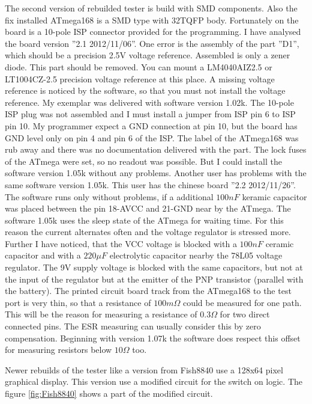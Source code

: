The second version of rebuilded tester is build with SMD components. Also the fix installed ATmega168
is a SMD type with 32TQFP body.
Fortunately on the board is a 10-pole ISP connector provided for the programming.
I have analysed the board version ''2.1 2012/11/06''. One error is the assembly of the part ''D1'',
which should be a precision 2.5V voltage reference. Assembled is only a zener diode.
This part should be removed. You can mount a LM4040AIZ2.5 or LT1004CZ-2.5 precision voltage reference
at this place. A missing voltage reference is noticed by the software, so that you must not install
the voltage reference.
My exemplar was delivered with software version 1.02k. The 10-pole ISP plug was not assembled and I must
install a jumper from ISP pin 6 to ISP pin 10. My programmer expect a GND connection at pin 10, but the
board has GND level only on pin 4 and pin 6 of the ISP.
The label of the ATmega168 was rub away and there was no documentation delivered with the part.
The lock fuses of the ATmega were set, so no readout was possible.
But I could install the software version 1.05k without any problems.
Another user has problems with the same software version 1.05k. This user has the chinese board ''2.2 2012/11/26''.
The software runs only without problems, if a additional \(100nF\) keramic capacitor was placed between
the pin 18-AVCC and 21-GND near by the ATmega.
The software 1.05k uses the sleep state of the ATmega for waiting time. For this reason the current alternates
often and the voltage regulator is stressed more.
Further I have noticed, that the VCC voltage is blocked with a \(100nF\) ceramic capacitor and with a
\(220\mu F\) electrolytic capacitor nearby the 78L05 voltage regulator.
The 9V supply voltage is blocked with the same capacitors, but not at the input of the regulator but
at the emitter of the PNP transistor (parallel with the battery). 
The printed circuit board track from the ATmega168 to the test port is very thin, so that a resistance
of \(100m \Omega\) could be measured for one path. This will be the reason for measuring a resistance
of \(0.3 \Omega\) for two direct connected pins.
The ESR measuring can usually consider this by zero compensation.
Beginning with version 1.07k  the software does respect this offset for measuring resistors below \(10 \Omega\) too.

Newer rebuilds of the tester like a version from Fish8840  use a 128x64 pixel graphical display.
This version use a modified circuit for the switch on logic. 
The figure \ref{fig:Fish8840} shows a part of the modified circuit.

